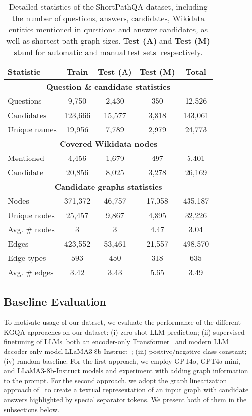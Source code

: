 \begin{table*}[t!]
    \centering
    \caption{Detailed statistics of the ShortPathQA dataset, including the number of questions, answers, candidates, Wikidata entities mentioned in questions and answer candidates, as well as shortest path graph sizes. \textbf{Test (A)} and \textbf{Test (M)} stand for automatic and manual test sets, respectively.}
    \label{tab:data_statistics}
    \begin{tabular}{l|cccc}
    \toprule
    \textbf{Statistic} & \textbf{Train} & \textbf{Test (A)} & \textbf{Test (M)} & \textbf{Total} \\
    \midrule
    \multicolumn{5}{c}{\textbf{Question \& candidate statistics}} \\
    \midrule
    Questions & 9,750 & 2,430 & 350 & 12,526 \\
    Candidates & 123,666 & 15,577 & 3,818 & 143,061 \\
    Unique names & 19,956 & 7,789 & 2,979 & 24,773 \\
    \midrule
    \multicolumn{5}{c}{\textbf{Covered Wikidata nodes}} \\
    \midrule
    Mentioned & 4,456 & 1,679 & 497 & 5,401 \\
    Candidate & 20,856 & 8,025 & 3,278 & 26,169 \\
    \midrule
    \multicolumn{5}{c}{\textbf{Candidate graphs statistics}} \\
    \midrule
    Nodes & 371,372 & 46,757 & 17,058 & 435,187 \\
    Unique nodes & 25,457 & 9,867 & 4,895 & 32,226 \\
    Avg. \# nodes & 3 & 3 & 4.47 & 3.04 \\
    Edges & 423,552 & 53,461 & 21,557 & 498,570 \\
    Edge types & 593 & 450 & 318 & 635 \\
    Avg. \# edges & 3.42 & 3.43 & 5.65 & 3.49 \\
    \bottomrule
    \end{tabular}
\end{table*}
    

\subsection{Baseline Evaluation}

To motivate usage of our dataset, we evaluate the performance of the different KGQA approaches on our dataset: (i) zero-shot LLM prediction; (ii) supervised finetuning of LLMs, both an encoder-only Transformer~\cite{DBLP:conf/nips/VaswaniSPUJGKP17} and modern LLM decoder-only model LLaMA3-8b-Instruct~\cite{DBLP:journals/corr/abs-2407-21783-llama3}; (iii) positive/negative class constant; (iv) random baseline. For the first approach, we employ GPT4o, GPT4o mini, and LLaMA3-8b-Instruct models and experiment with adding graph information to the prompt. For the second approach, we adopt the graph linearization approach of~\cite{DBLP:journals/corr/abs-2310-02166} to create a textual representation of an input graph with candidate answers highlighted by special separator tokens. We present both of them in the subsections below.

